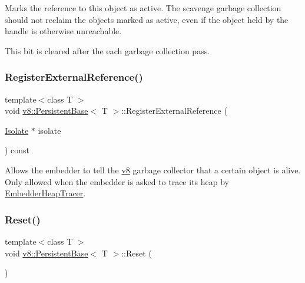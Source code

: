Marks the reference to this object as active. The scavenge garbage collection should not reclaim the objects marked as active, even if the object held by the handle is otherwise unreachable.

This bit is cleared after the each garbage collection pass. \mbox{\label{classv8_1_1PersistentBase_a427ad28478a6a208605fca3d39ce4bdf}} 
\subsubsection{\texorpdfstring{Register\+External\+Reference()}{RegisterExternalReference()}}
{\footnotesize\ttfamily template$<$class T $>$ \\
void \mbox{\hyperlink{classv8_1_1PersistentBase}{v8\+::\+Persistent\+Base}}$<$ T $>$\+::Register\+External\+Reference (\begin{DoxyParamCaption}\item[{\mbox{\hyperlink{classv8_1_1Isolate}{Isolate}} $\ast$}]{isolate }\end{DoxyParamCaption}) const}

Allows the embedder to tell the \mbox{\hyperlink{namespacev8}{v8}} garbage collector that a certain object is alive. Only allowed when the embedder is asked to trace its heap by \mbox{\hyperlink{classv8_1_1EmbedderHeapTracer}{Embedder\+Heap\+Tracer}}. \mbox{\label{classv8_1_1PersistentBase_a174bb1e45b18fd4eeaee033622825bb8}} 
\subsubsection{\texorpdfstring{Reset()}{Reset()}\hspace{0.1cm}{\footnotesize\ttfamily [1/3]}}
{\footnotesize\ttfamily template$<$class T $>$ \\
void \mbox{\hyperlink{classv8_1_1PersistentBase}{v8\+::\+Persistent\+Base}}$<$ T $>$\+::Reset (\begin{DoxyParamCaption}{ }\end{DoxyParamCaption})}

